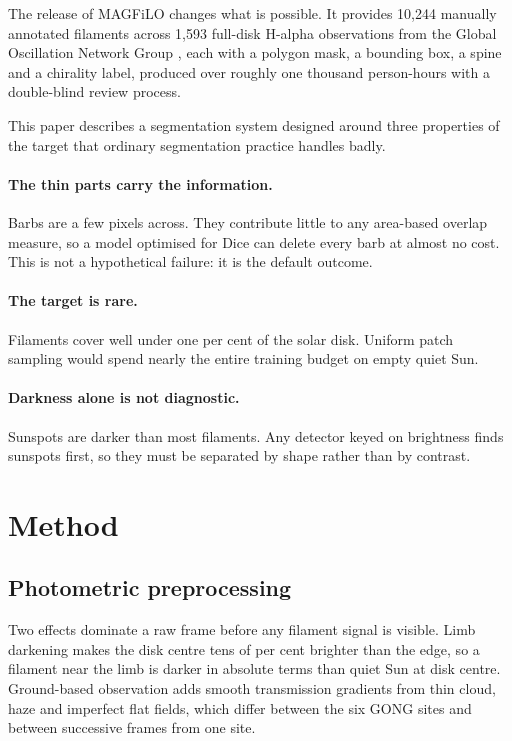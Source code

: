 \documentclass[11pt]{article}
\begin{document}
The release of MAGFiLO \cite{magfilo2024} changes what is possible. It provides
10,244 manually annotated filaments across 1,593 full-disk H-alpha observations
from the Global Oscillation Network Group \cite{gong1996}, each with a polygon
mask, a bounding box, a spine and a chirality label, produced over roughly one
thousand person-hours with a double-blind review process.

This paper describes a segmentation system designed around three properties of
the target that ordinary segmentation practice handles badly.

\paragraph{The thin parts carry the information.}
Barbs are a few pixels across. They contribute little to any area-based
overlap measure, so a model optimised for Dice can delete every barb at almost
no cost. This is not a hypothetical failure: it is the default outcome.

\paragraph{The target is rare.}
Filaments cover well under one per cent of the solar disk. Uniform patch
sampling would spend nearly the entire training budget on empty quiet Sun.

\paragraph{Darkness alone is not diagnostic.}
Sunspots are darker than most filaments. Any detector keyed on brightness finds
sunspots first, so they must be separated by shape rather than by contrast.

\section{Method}

\subsection{Photometric preprocessing}

Two effects dominate a raw frame before any filament signal is visible. Limb
darkening makes the disk centre tens of per cent brighter than the edge, so a
filament near the limb is darker in absolute terms than quiet Sun at disk
centre. Ground-based observation adds smooth transmission gradients from thin
cloud, haze and imperfect flat fields, which differ between the six GONG sites
and between successive frames from one site.
\end{document}
